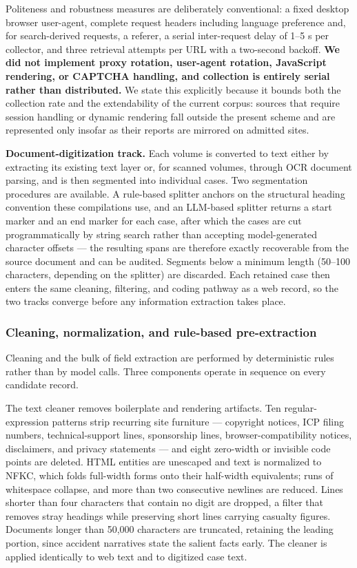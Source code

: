 \documentclass[11pt]{article}
\begin{document}
Politeness and robustness measures are deliberately conventional: a fixed desktop browser user-agent, complete request headers including language preference and, for search-derived requests, a referer, a serial inter-request delay of 1--5 s per collector, and three retrieval attempts per URL with a two-second backoff. \textbf{We did not implement proxy rotation, user-agent rotation, JavaScript rendering, or CAPTCHA handling, and collection is entirely serial rather than distributed.} We state this explicitly because it bounds both the collection rate and the extendability of the current corpus: sources that require session handling or dynamic rendering fall outside the present scheme and are represented only insofar as their reports are mirrored on admitted sites.

\textbf{Document-digitization track.} Each volume is converted to text either by extracting its existing text layer or, for scanned volumes, through OCR document parsing, and is then segmented into individual cases. Two segmentation procedures are available. A rule-based splitter anchors on the structural heading convention these compilations use, and an LLM-based splitter returns a start marker and an end marker for each case, after which the cases are cut programmatically by string search rather than accepting model-generated character offsets --- the resulting spans are therefore exactly recoverable from the source document and can be audited. Segments below a minimum length (50--100 characters, depending on the splitter) are discarded. Each retained case then enters the same cleaning, filtering, and coding pathway as a web record, so the two tracks converge before any information extraction takes place.

\subsubsection{Cleaning, normalization, and rule-based pre-extraction}
Cleaning and the bulk of field extraction are performed by deterministic rules rather than by model calls. Three components operate in sequence on every candidate record.

The text cleaner removes boilerplate and rendering artifacts. Ten regular-expression patterns strip recurring site furniture --- copyright notices, ICP filing numbers, technical-support lines, sponsorship lines, browser-compatibility notices, disclaimers, and privacy statements --- and eight zero-width or invisible code points are deleted. HTML entities are unescaped and text is normalized to NFKC, which folds full-width forms onto their half-width equivalents; runs of whitespace collapse, and more than two consecutive newlines are reduced. Lines shorter than four characters that contain no digit are dropped, a filter that removes stray headings while preserving short lines carrying casualty figures. Documents longer than 50,000 characters are truncated, retaining the leading portion, since accident narratives state the salient facts early. The cleaner is applied identically to web text and to digitized case text.
\end{document}
